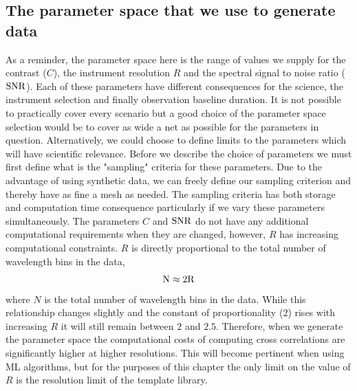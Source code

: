 \subsection{The parameter space that we use to generate data}
As a reminder, the parameter space here is the range of values we supply for the contrast ($C$), the instrument resolution $R$ and the spectral signal to noise ratio ($\rm{SNR}$).
Each of these parameters have different consequences for the science, the instrument selection and finally observation baseline duration.
It is not possible to practically cover every scenario but a good choice of the parameter space selection would be to cover as wide a net as possible for the parameters in question.
Alternatively, we could choose to define limits to the parameters which will have scientific relevance.
Before we describe the choice of parameters we must first define what is the "sampling" criteria for these parameters.
Due to the advantage of using synthetic data, we can freely define our sampling criterion and thereby have as fine a mesh as needed.
The sampling criteria has both storage and computation time consequence particularly if we vary these parameters simultaneously.
The parameters $C$ and $\rm{SNR}$ do not have any additional computational requirements when they are changed, however, $R$ has increasing computational constraints.
$R$ is directly proportional to the total number of wavelength bins in the data, 
\begin{equation}
    \rm{N}\approx 2R
\end{equation}
where $N$ is the total number of wavelength bins in the data. 
While this relationship changes slightly and the constant of proportionality ($2$) rises with increasing $R$ it will still remain between $2$ and $2.5$.
Therefore, when we generate the parameter space the computational costs of computing cross correlations are significantly higher at higher resolutions.
This will become pertinent when using ML algorithms, but for the purposes of this chapter the only limit on the value of $R$ is the resolution limit of the template library.

